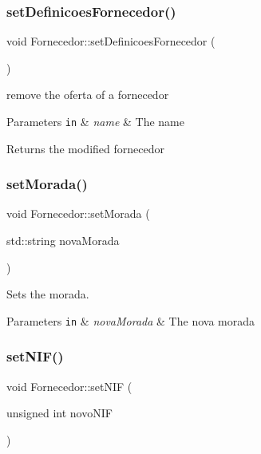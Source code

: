 \subsubsection{\texorpdfstring{set\+Definicoes\+Fornecedor()}{setDefinicoesFornecedor()}}
{\footnotesize\ttfamily void Fornecedor\+::set\+Definicoes\+Fornecedor (\begin{DoxyParamCaption}{ }\end{DoxyParamCaption})}



remove the oferta of a fornecedor 


\begin{DoxyParams}[1]{Parameters}
\mbox{\tt in}  & {\em name} & The name\\
\hline
\end{DoxyParams}
\begin{DoxyReturn}{Returns}
the modified fornecedor 
\end{DoxyReturn}
\mbox{\label{classFornecedor_a240f4abc6ac49f030c93679b3628e222}} 
\subsubsection{\texorpdfstring{set\+Morada()}{setMorada()}}
{\footnotesize\ttfamily void Fornecedor\+::set\+Morada (\begin{DoxyParamCaption}\item[{std\+::string}]{nova\+Morada }\end{DoxyParamCaption})\hspace{0.3cm}{\ttfamily [inline]}}



Sets the morada. 


\begin{DoxyParams}[1]{Parameters}
\mbox{\tt in}  & {\em nova\+Morada} & The nova morada \\
\hline
\end{DoxyParams}
\mbox{\label{classFornecedor_a9bbb88ef7aa281df4042aeedadcd510e}} 
\subsubsection{\texorpdfstring{set\+N\+I\+F()}{setNIF()}}
{\footnotesize\ttfamily void Fornecedor\+::set\+N\+IF (\begin{DoxyParamCaption}\item[{unsigned int}]{novo\+N\+IF }\end{DoxyParamCaption})\hspace{0.3cm}{\ttfamily [inline]}}



